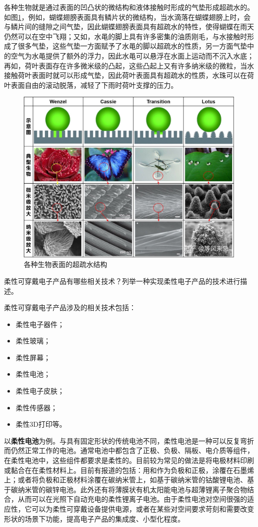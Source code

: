 \documentclass{assignment}
\begin{document}
\begin{da}
    各种生物就是通过表面的凹凸状的微结构和液体接触时形成的气垫形成超疏水的。如图\ref{Super-hydrophobic}，例如，蝴蝶翅膀表面具有鳞片状的微结构，当水滴落在蝴蝶翅膀上时，会与鳞片间的缝隙之间气垫，因此蝴蝶翅膀表面具有超疏水的特性，使得蝴蝶在雨天仍然可以在空中飞翔；又如，水黾的脚上具有许多密集的油质刚毛，与水接触时形成了很多气垫，这些气垫一方面赋予了水黾的脚以超疏水的性质，另一方面气垫中的空气为水黾提供了额外的浮力，因此水黾可以悬浮在水面上运动而不沉入水底；再如，荷叶表面存在许多微米级的凸起，这些凸起上又有许多纳米级的微粒，当水接触荷叶表面时就可以形成气垫，因此荷叶表面具有超疏水的性质，水珠可以在荷叶表面自由的滚动脱落，减轻了下雨时荷叶支撑的压力。
    \begin{figure}[H]
        \centering
        \includegraphics[width=.5\columnwidth]{Super-hydrophobic.jpg}
        \caption{各种生物表面的超疏水结构}
        \label{Super-hydrophobic}
    \end{figure}
\end{da}

\begin{ti}
    柔性可穿戴电子产品有哪些相关技术？列举一种实现柔性电子产品的技术进行描述。
\end{ti}
\begin{da}
    柔性可穿戴电子产品涉及的相关技术包括：
    \begin{itemize}
        \item[(1)] 柔性电子器件；
        \item[(2)] 柔性玻璃；
        \item[(3)] 柔性屏幕；
        \item[(4)] 柔性电池；
        \item[(5)] 柔性电子皮肤；
        \item[(6)] 柔性传感器；
        \item[(7)] 柔性3D打印等。
    \end{itemize}

    以\textbf{柔性电池}为例。与具有固定形状的传统电池不同，柔性电池是一种可以反复弯折而仍然正常工作的电池。通常电池中都包含了正极、负极、隔板、电介质等组件，在柔性电池中，这些组件都要求是柔性的。目前较为常见的做法是将电极材料印刷或黏合在在柔性材料上。目前有报道的包括：用和作为负极和正极，涂覆在石墨烯上\cite{li2012flexible}；或者将负极和正极材料涂覆在碳纳米管上，如基于碳纳米管的钴酸锂电池\cite{hu2010thin}、基于碳纳米管的碳锌电池\cite{hiralal2010nanomaterial}。此外还有将薄膜状有机太阳能电池与超薄锂离子聚合物结合，从而可以在光照下自动充电的柔性锂离子电池\cite{flexible}。由于柔性电池对空间很强的适应性，它可以为柔性可穿戴设备提供电源，或者在某些对空间要求苛刻和需要改变形状的场景下功能，提高电子产品的集成度、小型化程度。
\end{da}
\end{document}
